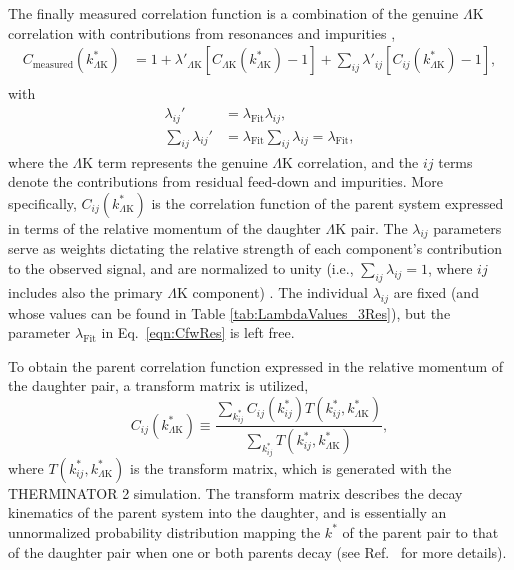 \documentclass[ALICE,manyauthors]{cernphprep}
\newcommand{\kstar}{$k^{*}$\xspace}
\newcommand{\LamK}{$\Lambda$K\xspace}
\begin{document}
The finally measured correlation function is a combination of the genuine \LamK correlation with contributions from resonances and impurities \cite{Kisiel:2014mma},
\begin{equation}
\begin{aligned}
\label{eqn:CfwRes} 
 C_{\mathrm{measured}}(k^{*}_{\Lambda\mathrm{K}}) &= 1 + \lambda'_{\Lambda\mathrm{K}}[C_{\Lambda\mathrm{K}}(k^{*}_{\Lambda\mathrm{K}}) - 1] + \sum\limits_{ij}  \lambda'_{ij}[C_{ij}(k^{*}_{\Lambda\mathrm{K}})-1], \\
\end{aligned} 
\end{equation}
with
\begin{equation}
\begin{aligned}
\label{eqn:CfwRes2} 
 \lambda_{ij}' &= \lambda_{\mathrm{Fit}}\lambda_{ij}, \\
 \sum\limits_{ij}\lambda_{ij}' &=  \lambda_{\mathrm{Fit}}\sum\limits_{ij}\lambda_{ij} = \lambda_{\mathrm{Fit}},
\end{aligned} 
\end{equation}
where the \LamK term represents the genuine \LamK correlation, and the $ij$ terms denote the contributions from residual feed-down and impurities.
More specifically, $C_{ij}(k^{*}_{\Lambda\mathrm{K}})$ is the correlation function of the parent system expressed in terms of the relative momentum of the daughter \LamK pair.  
The $\lambda_{ij}$ parameters serve as weights dictating the relative strength of each component's contribution to the observed signal, and are normalized to unity (i.e., $\sum_{ij} \lambda_{ij} = 1$, where $ij$ includes also the primary \LamK component) \cite{Kisiel:2014mma, Acharya:2018gyz}.
The individual $\lambda_{ij}$ are fixed (and whose values can be found in Table \ref{tab:LambdaValues_3Res}), but the parameter $\lambda_{\mathrm{Fit}}$ in Eq.\ \ref{eqn:CfwRes} is left free.


To obtain the parent correlation function expressed in the relative momentum of the daughter pair, a transform matrix is utilized,
\begin{equation}
  C_{ij}(k^{*}_{\Lambda\mathrm{K}}) \equiv \frac{\sum\limits_{k^{*}_{ij}} C_{ij}\left(k^{*}_{ij}\right) T\left(k^{*}_{ij},k^{*}_{\Lambda\mathrm{K}}\right)}{\sum\limits_{k^{*}_{ij}} T\left(k^{*}_{ij},k^{*}_{\Lambda\mathrm{K}}\right)},
\label{eqn:ResidualsTransform}
\end{equation}
where $T(k^{*}_{ij},k^{*}_{\Lambda\mathrm{K}})$ is the transform matrix, which is generated with the THERMINATOR 2 \cite{Chojnacki:2011hb} simulation. 
The transform matrix describes the decay kinematics of the parent system into the daughter, and is essentially an unnormalized probability distribution mapping the \kstar of the parent pair to that of the daughter pair when one or both parents decay (see Ref.\ \cite{Kisiel:2014mma} for more details).
\end{document}
